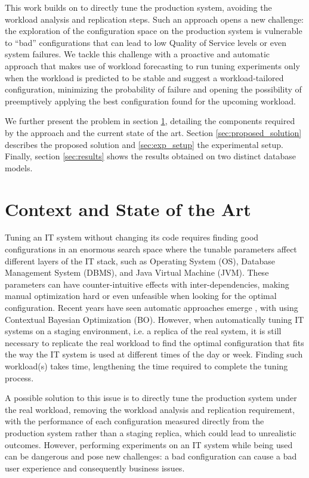 \documentclass[a4paper, 12pt]{article} %
\begin{document}
	This work builds on \cite{AkamasCGP} to directly tune the production system, avoiding the workload analysis and replication steps. Such an approach opens a new challenge: the exploration of the configuration space on the production system is vulnerable to ``bad'' configurations that can lead to low Quality of Service levels or even system failures.  We tackle this challenge with a proactive and automatic approach that makes use of workload forecasting to run tuning experiments only when the workload is predicted to be stable and suggest a workload-tailored configuration, minimizing the probability of failure and opening the possibility of preemptively applying the best configuration found for the upcoming workload. 
	
	We further present the problem in section \ref{sec:context_and_state_of_the_art}, detailing the components required by the approach and the current state of the art. Section \ref{sec:proposed_solution} describes the proposed solution and \ref{sec:exp_setup} the experimental setup. Finally, section \ref{sec:results} shows the results obtained on two distinct database models.
	
	\section{Context and State of the Art } \label{sec:context_and_state_of_the_art}
	Tuning an IT system without changing its code requires finding good configurations in an enormous search space where the tunable parameters affect different layers of the IT stack, such as Operating System (OS), Database Management System (DBMS), and Java Virtual Machine (JVM). These parameters can have counter-intuitive effects with inter-dependencies, making manual optimization hard or even unfeasible when looking for the optimal configuration. Recent years have seen automatic approaches emerge \cite{AkamasCGP, OtterTune, OtterTune2, LearningToSample}, with \cite{AkamasCGP} using Contextual Bayesian Optimization (BO). However, when automatically tuning IT systems on a staging environment, i.e. a replica of the real system, it is still necessary to replicate the real workload to find the optimal configuration that fits the way the IT system is used at different times of the day or week. Finding such workload(s) takes time, lengthening the time required to complete the tuning process.
	
	A possible solution to this issue is to directly tune the production system under the real workload, removing the workload analysis and replication requirement, with the performance of each configuration measured directly from the production system rather than a staging replica, which could lead to unrealistic outcomes. However, performing experiments on an IT system while being used can be dangerous and pose new challenges: a bad configuration can cause a bad user experience and consequently business issues.
	
\end{document}

